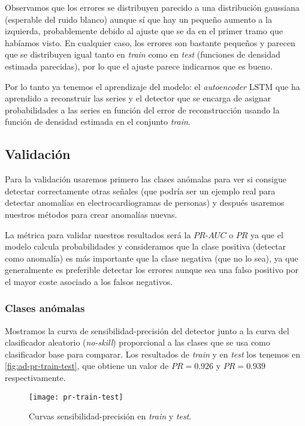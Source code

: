 Observamos que los errores se distribuyen parecido a una distribución gaussiana (esperable del ruido blanco) aunque sí que hay un pequeño aumento a la izquierda, probablemente debido al ajuste que se da en el primer tramo que habíamos visto. En cualquier caso, los errores son bastante pequeños y parecen que se distribuyen igual tanto en \emph{train} como en \emph{test} (funciones de densidad estimada parecidas), por lo que el ajuste parece indicarnos que es bueno.

Por lo tanto ya tenemos el aprendizaje del modelo: el \emph{autoencoder} LSTM que ha aprendido a reconstruir las series y el detector que se encarga de asignar probabilidades a las series en función del error de reconstrucción usando la función de densidad estimada en el conjunto \emph{train}.

\subsection{Validación}

Para la validación usaremos primero las clases anómalas para ver si consigue detectar correctamente otras señales (que podría ser un ejemplo real para detectar anomalías en electrocardiogramas de personas) y después usaremos nuestros métodos para crear anomalías nuevas.

La métrica para validar nuestros resultados será la $PR$-$AUC$ o $PR$ ya que el modelo calcula probabilidades y consideramos que la clase positiva (detectar como anomalía) es más importante que la clase negativa (que no lo sea), ya que generalmente es preferible detectar los errores aunque sea una falso positivo por el mayor coste asociado a los falsos negativos.

\subsubsection{Clases anómalas}

Mostramos la curva de sensibilidad-precisión del detector junto a la curva del clasificador aleatorio (\emph{no-skill}) proporcional a las clases que se usa como clasificador base para comparar. Los resultados de \emph{train} y en \emph{test} los tenemos en \autoref{fig:ad-pr-train-test}, que obtiene un valor de $PR = 0.926$ y $PR = 0.939$ respectivamente.

\begin{figure}[htpb]
  \centering
  \texttt{[image: pr-train-test]}
  \caption{Curvas sensibilidad-precisión en \emph{train} y \emph{test}.}
  \label{fig:ad-pr-train-test}
\end{figure}

